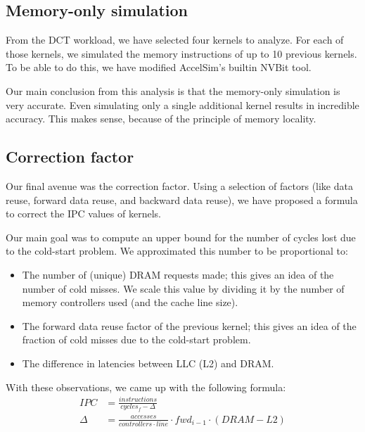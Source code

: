 \subsection{Memory-only simulation}\label{subsec:memory-only-simulation}
From the DCT workload, we have selected four kernels to analyze.
For each of those kernels, we simulated the memory instructions of up to 10 previous kernels.
To be able to do this, we have modified AccelSim's builtin NVBit tool.

Our main conclusion from this analysis is that the memory-only simulation is very accurate.
Even simulating only a single additional kernel results in incredible accuracy.
This makes sense, because of the principle of memory locality.

\subsection{Correction factor}\label{subsec:correction-factor}
Our final avenue was the correction factor.
Using a selection of factors (like data reuse, forward data reuse, and backward data reuse), we have proposed a formula to correct the IPC values of kernels.

Our main goal was to compute an upper bound for the number of cycles lost due to the cold-start problem.
We approximated this number to be proportional to:
\begin{itemize}
    \item The number of (unique) DRAM requests made; this gives an idea of the number of cold misses.
    We scale this value by dividing it by the number of memory controllers used (and the cache line size).
    \item The forward data reuse factor of the previous kernel; this gives an idea of the fraction of cold misses due to the cold-start problem.
    \item The difference in latencies between LLC (L2) and DRAM\@.
\end{itemize}

With these observations, we came up with the following formula:
\begin{align}
    IPC &= \frac{instructions}{cycles_f - \Delta} \\
    \Delta &= \frac{accesses}{controllers \cdot line} \cdot fwd_{i-1} \cdot (DRAM - L2)
\end{align}

